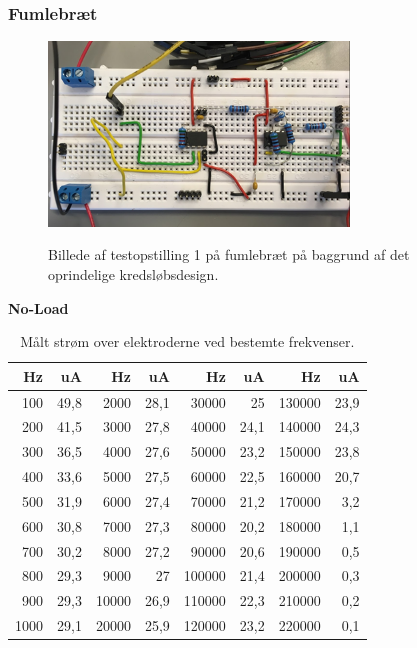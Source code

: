\subsubsection{Fumlebræt}




\begin{figure}[H]
\centering
{\includegraphics[width=8cm]
{Figure/oprindeligekredslob}}
\caption{Billede af testopstilling 1 på fumlebræt på baggrund af det oprindelige kredsløbsdesign.}
\label{fig:oprindeligekredslob}
\end{figure}

\textbf{No-Load}\\

\begin{table}[H]
\centering
\begin{tabular}{| r | r || r | r || r | r || r | r |}
    \hline
    \textbf{Hz} & \textbf{uA} & \textbf{Hz} & \textbf{uA} & \textbf{Hz} & \textbf{uA} & \textbf{Hz} & \textbf{uA}\\ \hline
    100 & 49,8 & 2000 & 28,1 & 30000 & 25 & 130000 & 23,9  \\ \hline
    200 & 41,5 & 3000 & 27,8 & 40000 & 24,1 & 140000 & 24,3  \\ \hline
    300 & 36,5 & 4000 & 27,6 & 50000 & 23,2 & 150000 & 23,8  \\ \hline
    400 & 33,6 & 5000 & 27,5 & 60000 & 22,5 & 160000 & 20,7  \\ \hline
    500 & 31,9 & 6000 & 27,4 & 70000 & 21,2 & 170000 & 3,2  \\ \hline
    600 & 30,8 & 7000 & 27,3 & 80000 & 20,2 & 180000 & 1,1  \\ \hline
    700 & 30,2 & 8000 & 27,2 & 90000 & 20,6 & 190000 & 0,5  \\ \hline
    800 & 29,3 & 9000 & 27 & 100000 & 21,4 &  200000 & 0,3  \\ \hline
    900 & 29,3 & 10000 & 26,9 & 110000 & 22,3 &  210000 & 0,2   \\ \hline
    1000 & 29,1 & 20000 & 25,9 & 120000 & 23,2 &  220000 & 0,1  \\ \hline
\end{tabular}
    \caption{Målt strøm over elektroderne ved bestemte frekvenser.}
    \label{table:frekvensernoload}
\end{table} 













